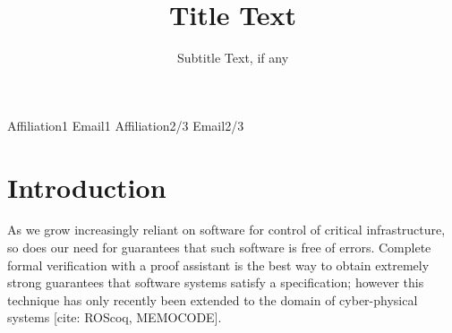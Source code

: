 \documentclass[10pt]{sigplanconf}
\begin{document}
\setlength{\pdfpageheight}{\paperheight}
\setlength{\pdfpagewidth}{\paperwidth}






\title{Title Text}
\subtitle{Subtitle Text, if any}

           {Affiliation1}
           {Email1}
           {Affiliation2/3}
           {Email2/3}

\maketitle





\section{Introduction}          %

As we grow increasingly reliant on software for control of critical infrastructure, so does our need for guarantees that such software is free of errors. Complete formal verification with a proof assistant is the best way to obtain extremely strong guarantees that software systems satisfy a specification; however this technique has only recently been extended to the domain of cyber-physical systems [cite: ROScoq, MEMOCODE]. %
\end{document}
